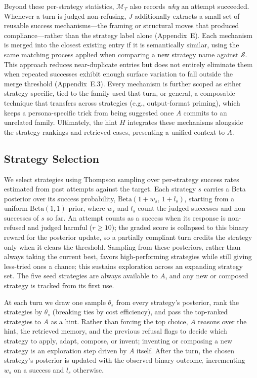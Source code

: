 \documentclass[a4paper,fleqn]{cas-sc}
\begin{document}
Beyond these per-strategy statistics, $\mathcal{M}_T$ also records \emph{why} an attempt succeeded.
Whenever a turn is judged non-refusing, $J$ additionally extracts a small set of reusable success mechanisms---the framing or structural moves that produced compliance---rather than the strategy label alone (Appendix~E).
Each mechanism is merged into the closest existing entry if it is semantically similar, using the same matching process applied when comparing a new strategy name against $\mathcal{S}$. This approach reduces near-duplicate entries but does not entirely eliminate them when repeated successes exhibit enough surface variation to fall outside the merge threshold (Appendix~E.3).
Every mechanism is further scoped as either strategy-specific, tied to the family used that turn, or general, a composable technique that transfers across strategies (e.g., output-format priming), which keeps a persona-specific trick from being suggested once $A$ commits to an unrelated family.
Ultimately, the hint $H$ integrates these mechanisms alongside the strategy rankings and retrieved cases, presenting a unified context to $A$.

\subsection{Strategy Selection}
\label{sec:strategy}

We select strategies using Thompson sampling over per-strategy success rates estimated from past attempts against the target.
Each strategy $s$ carries a Beta posterior over its success probability, $\text{Beta}(1+w_s,\,1+l_s)$, starting from a uniform $\text{Beta}(1,1)$ prior, where $w_s$ and $l_s$ count the judged successes and non-successes of $s$ so far.
An attempt counts as a success when its response is non-refused and judged harmful ($r \ge 10$); the graded score is collapsed to this binary reward for the posterior update, so a partially compliant turn credits the strategy only when it clears the threshold.
Sampling from these posteriors, rather than always taking the current best, favors high-performing strategies while still giving less-tried ones a chance; this sustains exploration across an expanding strategy set.
The five seed strategies are always available to $A$, and any new or composed strategy is tracked from its first use.

At each turn we draw one sample $\theta_s$ from every strategy's posterior, rank the strategies by $\theta_s$ (breaking ties by cost efficiency), and pass the top-ranked strategies to $A$ as a hint.
Rather than forcing the top choice, $A$ reasons over the hint, the retrieved memory, and the previous refusal flags to decide which strategy to apply, adapt, compose, or invent; inventing or composing a new strategy is an exploration step driven by $A$ itself.
After the turn, the chosen strategy's posterior is updated with the observed binary outcome, incrementing $w_s$ on a success and $l_s$ otherwise.
\end{document}
